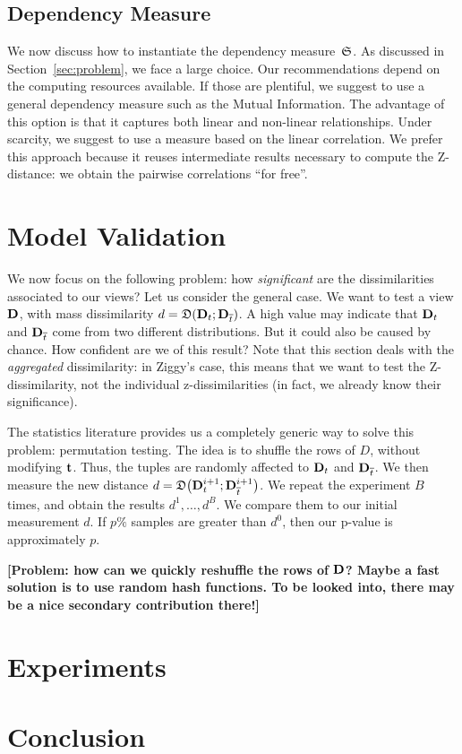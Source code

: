 \subsection{Dependency Measure}
\label{sec:dependency}

We now discuss how to instantiate the dependency measure~$\mathfrak{S}$. As discussed
in Section~\ref{sec:problem}, we face a large choice. Our recommendations
depend on the computing resources available. If those are plentiful, we suggest
to use a general dependency measure such as the Mutual Information. The
advantage of this option is that it captures both linear and non-linear
relationships. Under scarcity, we suggest to use a measure based on the linear
correlation. We prefer this approach because it reuses intermediate results necessary to
compute the Z-distance: we obtain the pairwise correlations ``for free''.


\section{Model Validation}
\label{sec:validation}

We now focus on the following problem: how \emph{significant} are the
dissimilarities associated to our views? Let us consider the general
case. We want to test a view $\mathbf{D}$, with mass dissimilarity $d = \mathfrak{D}(
\mathbf{D}_t  ; \mathbf{D}_{\overline{t}})$. A high value may indicate that  $\mathbf{D}_t$
and $\mathbf{D}_{\overline{t}}$ come from two different distributions. But it could
also be caused by chance. How confident are we of this result? Note that this
section deals with the \emph{aggregated} dissimilarity: in Ziggy's case, this
means that we want to test the Z-dissimilarity, not the individual
z-dissimilarities (in fact, we already know their significance).

The statistics literature provides us a completely generic way to solve this
problem: permutation testing. The idea is to shuffle the rows of $D$, without
modifying $\mathbf{t}$. Thus, the tuples are randomly affected to $\mathbf{D}_t$ and
$\mathbf{D}_{\overline{t}}$. We then measure the new distance $d=\mathfrak{D}\big(
\mathbf{D}^{i+1}_t  ; \mathbf{D}^{i+1}_{\overline{t}} \big)$. We repeat the experiment
$B$ times, and obtain the results $d^1, \ldots, d^B$. We compare them to our
initial measurement $d$. If $p\%$ samples are greater than $d^0$, then our
p-value is approximately $p$.

\textbf{[Problem: how can we quickly reshuffle the rows of
$\mathbf{D}$? Maybe a fast solution is to use random hash functions. To be
looked into, there may be a nice secondary contribution there!]}




\section{Experiments}
\label{sec:experiments}

\section{Conclusion}
\label{sec:conclusions}
